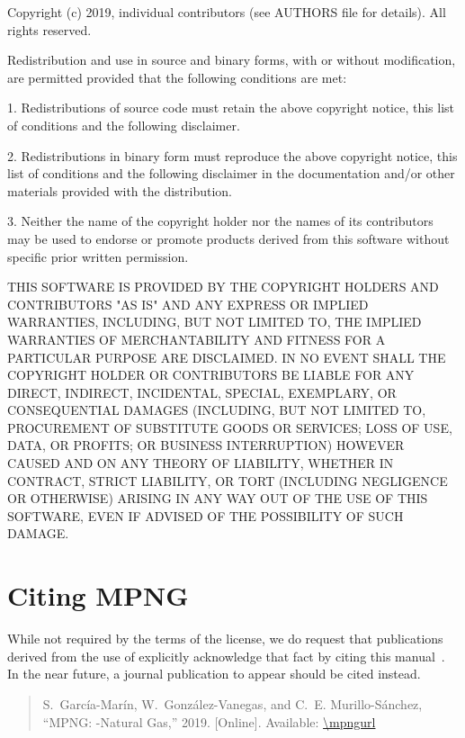 \begin{Notice}
Copyright (c) 2019, individual contributors (see AUTHORS file for 
details). All rights reserved.

Redistribution and use in source and binary forms, with or without
modification, are permitted provided that the following conditions
are met:

1. Redistributions of source code must retain the above copyright
notice, this list of conditions and the following disclaimer.

2. Redistributions in binary form must reproduce the above copyright
notice, this list of conditions and the following disclaimer in the
documentation and/or other materials provided with the distribution.

3. Neither the name of the copyright holder nor the names of its
contributors may be used to endorse or promote products derived from
this software without specific prior written permission.

THIS SOFTWARE IS PROVIDED BY THE COPYRIGHT HOLDERS AND CONTRIBUTORS
"AS IS" AND ANY EXPRESS OR IMPLIED WARRANTIES, INCLUDING, BUT NOT
LIMITED TO, THE IMPLIED WARRANTIES OF MERCHANTABILITY AND FITNESS
FOR A PARTICULAR PURPOSE ARE DISCLAIMED. IN NO EVENT SHALL THE
COPYRIGHT HOLDER OR CONTRIBUTORS BE LIABLE FOR ANY DIRECT, INDIRECT,
INCIDENTAL, SPECIAL, EXEMPLARY, OR CONSEQUENTIAL DAMAGES (INCLUDING,
BUT NOT LIMITED TO, PROCUREMENT OF SUBSTITUTE GOODS OR SERVICES;
LOSS OF USE, DATA, OR PROFITS; OR BUSINESS INTERRUPTION) HOWEVER
CAUSED AND ON ANY THEORY OF LIABILITY, WHETHER IN CONTRACT, STRICT
LIABILITY, OR TORT (INCLUDING NEGLIGENCE OR OTHERWISE) ARISING IN
ANY WAY OUT OF THE USE OF THIS SOFTWARE, EVEN IF ADVISED OF THE
POSSIBILITY OF SUCH DAMAGE.
\end{Notice}

\section{Citing MPNG}
\label{sec:citing_MPNG}

While not required by the terms of the license, we do request that publications derived from the use of \mpng{} explicitly acknowledge that fact by citing this manual~\cite{mpng2019}. In the near future, a journal publication to appear should be cited instead.

\begin{quote}
	\small
	S.~García-Marín, W.~González-Vanegas, and C.~E. Murillo-Sánchez, ``MPNG: \matpower{}-Natural Gas,'' 2019.
	[Online]. Available: \url{\mpngurl}
\end{quote}